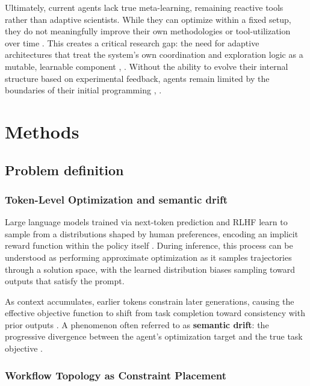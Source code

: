 \documentclass{article}
\begin{document}
Ultimately, current agents lack true meta-learning, remaining reactive tools rather than adaptive scientists. While they can optimize within a fixed setup, they do not meaningfully improve their own methodologies or tool-utilization over time \cite{23_hu_automated_2025}. This creates a critical research gap: the need for adaptive architectures that treat the system's own coordination and exploration logic as a mutable, learnable component \cite{25_robeyns_self-improving_2025}, \cite{27_pourcel_self-improving_2025}. Without the ability to evolve their internal structure based on experimental feedback, agents remain limited by the boundaries of their initial programming \cite{24_ke_mas-zero_2025}, \cite{28_huang_cascade_2025}.

\section{Methods}

\subsection{Problem definition}

\subsubsection{Token-Level Optimization and semantic drift}

Large language models trained via next-token prediction and RLHF learn to sample from a distributions shaped by human preferences, encoding an implicit reward function within the policy itself \cite{rafailov2024directpreferenceoptimizationlanguage}. During inference, this process can be understood as performing approximate optimization as it samples trajectories through a solution space, with the learned distribution biases sampling toward outputs that satisfy the prompt.

As context accumulates, earlier tokens constrain later generations, causing the effective objective function to shift from task completion toward consistency with prior outputs \cite{mohsin2026fundamentallimitsllmsscale}. A phenomenon often referred to as \textbf{semantic drift}: the progressive divergence between the agent's optimization target and the true task objective \cite{mohsin2026fundamentallimitsllmsscale}.

\subsubsection{Workflow Topology as Constraint Placement}
\end{document}
